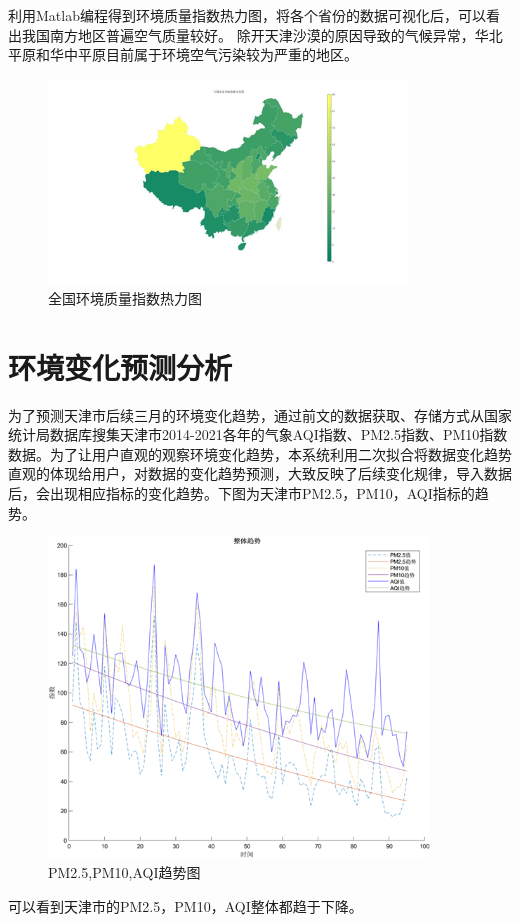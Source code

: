 \documentclass[UTF8]{ctexart}
\begin{document}
利用Matlab编程得到环境质量指数热力图，将各个省份的数据可视化后，可以看出我国南方地区普遍空气质量较好。
除开天津沙漠的原因导致的气候异常，华北平原和华中平原目前属于环境空气污染较为严重的地区。
\begin{figure}[H] %
    \centering %
    \includegraphics[width=0.85\textwidth]{./picture/renlitu.png} %
    \caption{全国环境质量指数热力图} 
\end{figure}

\newpage
\section{环境变化预测分析}
为了预测天津市后续三月的环境变化趋势，通过前文的数据获取、存储方式从国家统计局数据库搜集天津市2014-2021各年的气象AQI指数、PM2.5指数、PM10指数数据。为了让用户直观的观察环境变化趋势，本系统利用二次拟合将数据变化趋势直观的体现给用户，对数据的变化趋势预测，大致反映了后续变化规律，导入数据后，会出现相应指标的变化趋势。下图为天津市PM2.5，PM10，AQI指标的趋势。
\begin{figure}[H] %
    \centering %
    \includegraphics[width=0.9\textwidth]{./picture/PM2.5.png} %
    \caption{PM2.5,PM10,AQI趋势图} 
\end{figure}
可以看到天津市的PM2.5，PM10，AQI整体都趋于下降。
\end{document}
